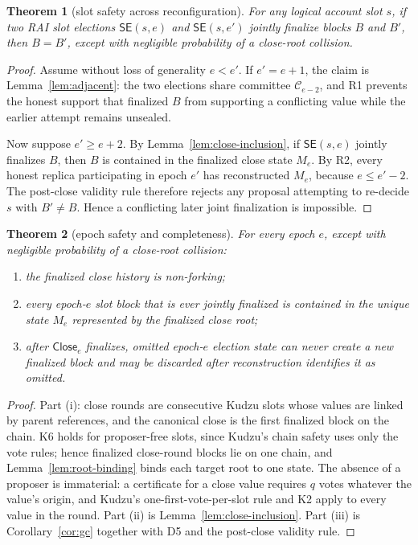 \documentclass[11pt]{article}
\newtheorem{theorem}{Theorem}
\theoremstyle{remark}
\newcommand{\C}{\mathcal{C}}
\newcommand{\SE}{\mathsf{SE}}
\newcommand{\CE}{\mathsf{Close}}
\begin{document}
\begin{theorem}[slot safety across reconfiguration]
\label{thm:slot-safety}
For any logical account slot $s$, if two RAI slot elections $\SE(s,e)$ and $\SE(s,e')$ jointly finalize blocks $B$ and $B'$, then $B=B'$, except with negligible probability of a close-root collision.
\end{theorem}

\begin{proof}
Assume without loss of generality $e<e'$. If $e'=e+1$, the claim is Lemma~\ref{lem:adjacent}: the two elections share committee $\C_{e-2}$, and R1 prevents the honest support that finalized $B$ from supporting a conflicting value while the earlier attempt remains unsealed.

Now suppose $e'\ge e+2$. By Lemma~\ref{lem:close-inclusion}, if $\SE(s,e)$ jointly finalizes $B$, then $B$ is contained in the finalized close state $M_e$. By R2, every honest replica participating in epoch $e'$ has reconstructed $M_e$, because $e\le e'-2$. The post-close validity rule therefore rejects any proposal attempting to re-decide $s$ with $B'\ne B$. Hence a conflicting later joint finalization is impossible.
\end{proof}

\begin{theorem}[epoch safety and completeness]
\label{thm:epoch-safety}
For every epoch $e$, except with negligible probability of a close-root collision:
\begin{enumerate}[label=(\roman*)]
  \item the finalized close history is non-forking;
  \item every epoch-$e$ slot block that is ever jointly finalized is contained in the unique state $M_e$ represented by the finalized close root;
  \item after $\CE_e$ finalizes, omitted epoch-$e$ election state can never create a new finalized block and may be discarded after reconstruction identifies it as omitted.
\end{enumerate}
\end{theorem}

\begin{proof}
Part (i): close rounds are consecutive Kudzu slots whose values are linked by parent references, and the canonical close is the first finalized block on the chain. K6 holds for proposer-free slots, since Kudzu's chain safety uses only the vote rules; hence finalized close-round blocks lie on one chain, and Lemma~\ref{lem:root-binding} binds each target root to one state. The absence of a proposer is immaterial: a certificate for a close value requires $q$ votes whatever the value's origin, and Kudzu's one-first-vote-per-slot rule and K2 apply to every value in the round. Part (ii) is Lemma~\ref{lem:close-inclusion}. Part (iii) is Corollary~\ref{cor:gc} together with D5 and the post-close validity rule.
\end{proof}
\end{document}
